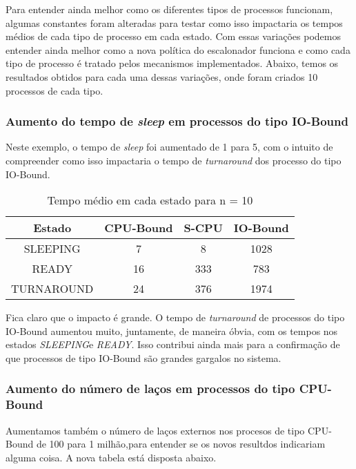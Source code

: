 \documentclass{article}
\begin{document}
Para entender ainda melhor como os diferentes tipos de processos funcionam,
algumas constantes foram alteradas para testar como isso impactaria os tempos
médios de cada tipo de processo em cada estado. Com essas variações podemos
entender ainda melhor como a nova política do escalonador funciona e como cada
tipo de processo é tratado pelos mecanismos implementados. Abaixo, temos os
resultados obtidos para cada uma dessas variações, onde foram criados 10
processos de cada tipo.

\subsubsection{Aumento do tempo de \textit{sleep} em processos do tipo
      IO-Bound}

Neste exemplo, o tempo de \textit{sleep} foi aumentado de 1 para 5, com o
intuito de compreender como isso impactaria o tempo de \textit{turnaround} dos
processo do tipo IO-Bound.

\begin{table}[H]
      \centering
      \begin{tabular}{|c|c|c|c|}
            \hline
            Estado     & CPU-Bound & S-CPU &
            IO-Bound                              \\
            \hline
            SLEEPING   & 7         & 8     & 1028 \\
            READY      & 16        & 333   & 783  \\
            TURNAROUND & 24        & 376   & 1974 \\
            \hline
      \end{tabular}
      \caption{Tempo médio em cada estado para n = 10}
\end{table}

Fica claro que o impacto é grande. O tempo de \textit{turnaround} de processos
do tipo IO-Bound aumentou muito, juntamente, de maneira óbvia, com os tempos
nos estados \textit{SLEEPING}e \textit{READY}. Isso contribui ainda mais para a
confirmação de que processos de tipo IO-Bound são grandes gargalos no sistema.

\subsubsection{Aumento do número de laços em processos do tipo CPU-Bound}

Aumentamos também o número de laços externos nos procesos de tipo CPU-Bound de
100 para 1 milhão,para entender se os novos resultdos indicariam alguma coisa.
A nova tabela está disposta abaixo.
\end{document}
